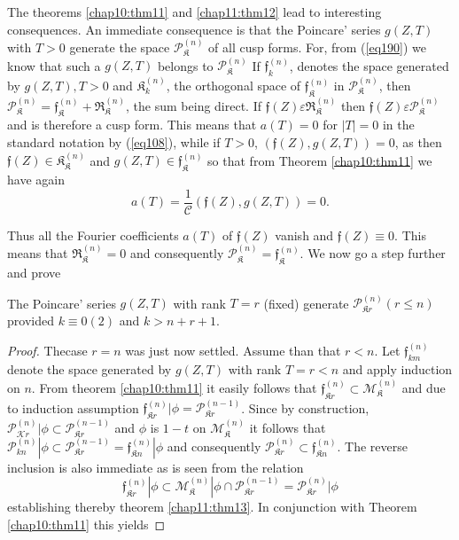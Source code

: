 The theorems \ref{chap10:thm11} and \ref{chap11:thm12} lead to
interesting consequences. An 
immediate consequence is that the Poincare' series $g(Z, T)$ with
$T>0$ generate the space  $\mathscr{P}^{(n)}_\mathfrak{K}$ of all cusp
forms. For, from (\ref{eq190}) 
we know that such a $g(Z, T)$ belongs to $\mathscr{P}^{(n)}_{\mathfrak{K}}$ If
$\mathfrak{f}_k^{(n)}$, denotes the space generated by $g(Z, T), T> 0$
and  $\mathfrak{K}_k^{(n)}$, the orthogonal space of
$\mathfrak{f}_\mathfrak{K}^{(n)}$ in $\mathscr{P}^{(n)}_\mathfrak{K}$, then
$\mathscr{P}^{(n)}_\mathfrak{K} =
\mathfrak{f}^{(n)}_\mathfrak{K}+\mathfrak{R}_\mathfrak{K}^{(n)}$,
the sum being  
direct. If $\mathfrak{f}(Z)\varepsilon  \mathfrak{R}_\mathfrak{K}^{(n)}$ then
$\mathfrak{f}(Z)\varepsilon   \mathscr{P}^{(n)}_\mathfrak{K}$ and is
therefore a cusp 
form. This means that $a(T)=0$ for $|T|=0$ in the standard notation by
(\ref{eq108}), while if $T>0$, $(\mathfrak{f}(Z), g(Z, T))=0$, as then
$\mathfrak{f}(Z)\in \mathfrak{K}_\mathfrak{K}^{(n)}$ and $g(Z, T)\in
\mathfrak{f}_\mathfrak{K}^{(n)}$ so that from Theorem
\ref{chap10:thm11} we have again  
$$
a(T) = \frac{1}{\mathscr{C}}(\mathfrak{f}(Z), g(Z, T)) = 0. 
$$

Thus all the Fourier coefficients $a (T)$ of $\mathfrak{f} (Z)$ vanish
and $\mathfrak{f}(Z) \equiv 0$. This means that
$\mathfrak{R}_\mathfrak{K}^{(n)} = 0$ and consequently
$\mathscr{P}^{(n)}_\mathfrak{K} = \mathfrak{f}_\mathfrak{K}^{(n)}$. We
now go a step further and prove 


\begin{thm}\label{chap11:thm13}%
The Poincare' series $g(Z, T)$ with rank $T= r$
(fixed) generate $\mathscr{P}_{\mathfrak{K} r}^{(n)}(r \leq n)$ 
  provided $k \equiv 0(2)$  and  $k > n + r + 1$. 
\end{thm}

\begin{proof}
The\pageoriginale  case $r=n$ was just now settled. Assume than that
$r < n$. Let 
$\mathfrak{f}_{km}^{(n)}$ denote the space generated by $g(Z, T)$ with
rank $T= r < n$ and apply induction on $n$. From theorem \ref{chap10:thm11} it
easily follows that $\mathfrak{f}_{\mathfrak{K}r}^{(n)}\subset
\mathscr{M}_\mathfrak{K}^{(n)}$ and due to induction assumption
$\mathfrak{f}_{\mathfrak{K}r}^{(n)}|\phi=
\mathscr{P}^{(n-1)}_{\mathfrak{K}r}$. Since by 
construction, $\mathscr{P}^{(n)}_{\mathscr{K}r} | \phi \subset  
\mathscr{P}^{(n-1)}_{\mathfrak{K}r}$ and $\phi$ is $1-t$ on
$\mathscr{M}_\mathfrak{K}^{(n)}$ it 
follows that $\mathscr{P}_{kn}^{(n)}| \phi \subset
\mathscr{P}_{\mathfrak{K}r}^{(n-1)}=\mathfrak{f}_{\mathfrak{K}n}^{(n)}|
\phi$ and consequently 
$\mathscr{P}_{\mathfrak{K}r}^{(n)} \subset
\mathfrak{f}_{\mathfrak{K}n}^{(n)}$. The reverse 
inclusion is also immediate as is seen from the relation 
$$
\mathfrak{f}_{\mathfrak{K}r}^{(n)}| \phi \subset
\mathscr{M}_\mathfrak{K}^{(n)}| \phi \cap 
\mathscr{P}_{\mathfrak{K}r}^{(n-1)} = \mathscr{P}^{(n)}_{\mathfrak{K}r}| \phi 
$$
establishing thereby theorem \ref{chap11:thm13}. In conjunction with
Theorem \ref{chap10:thm11} this yields 
\end{proof}

